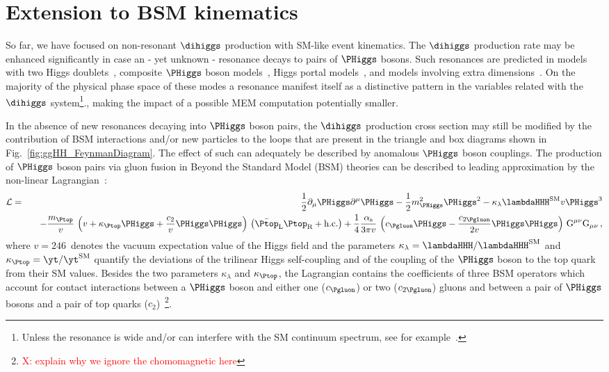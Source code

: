 \newpage
\section{Extension to BSM  kinematics}

So far, we have focused on non-resonant $\dihiggs$ production with SM-like event kinematics. 
The $\dihiggs$ production rate may be enhanced significantly in case an - yet unknown  - resonance decays to pairs of $\PHiggs$ bosons.
Such resonances are predicted in models with two Higgs doublets~\cite{Branco:2011iw}, composite $\PHiggs$ boson models~\cite{Grober:2010yv}, 
Higgs portal models~\cite{Patt:2006fw}, and models involving extra dimensions~\cite{Randall:1999ee}. 
On the majority of the physical phase space of these modes a resonance manifest 
itself as a distinctive pattern in the variables related with the $\dihiggs$ system\footnote{Unless the resonance is wide and/or can interfere with the SM continuum spectrum, see for example~\cite{Dawson:2015haa}.  }., making the impact of a possible MEM computation potentially smaller.

In the absence of new resonances decaying into $\PHiggs$ boson pairs,
the $\dihiggs$ production cross section may still be modified by the contribution of BSM interactions and/or new particles to the loops 
that are present in the triangle and box diagrams shown in Fig.~\ref{fig:ggHH_FeynmanDiagram}. 
The effect of such  can adequately be described by anomalous $\PHiggs$ boson couplings. 
The production of $\PHiggs$ boson pairs via gluon fusion in Beyond the Standard Model (BSM) theories can be described to leading approximation by the non-linear  Lagrangian~\cite{Buchmuller:1985jz}:
\begin{eqnarray}
\mathcal{L} & = & \frac{1}{2} \partial_{\mu}\PHiggs\partial^{\mu}\PHiggs - \frac{1}{2} m_{\PHiggs}^{2} \PHiggs^{2} - \kappa_{\lambda} \lambdaHHH^{\textrm{SM}} v \PHiggs^{3} \nonumber \\
 & & \quad -\frac{m_{\Ptop}}{v} \, \left( v + \kappa_{\Ptop} \PHiggs + \frac{c_{2}}{v} \PHiggs\PHiggs \right) \, \left( \bar{\Ptop}_{\textrm{L}} \Ptop_{\textrm{R}} + \textrm{h.c.} \right) 
+ \frac{1}{4} \frac{\alpha_{\textrm{s}}}{3 \pi v} \, \left( c_{\Pgluon} \PHiggs - \frac{c_{2\Pgluon}}{2 v} \PHiggs\PHiggs \right) \, \textrm{G}^{\mu\nu}\textrm{G}_{\mu\nu} \, ,
\end{eqnarray}
where $v = 246$~\GeV denotes the vacuum expectation value of the Higgs field
and the parameters $\kappa_{\lambda} = \lambdaHHH/\lambdaHHH^{\textrm{SM}}$ and $\kappa_{\Ptop} = \yt/\yt^{\textrm{SM}}$ 
quantify the deviations of the trilinear Higgs self-coupling and of the coupling of the $\PHiggs$ boson to the top quark from their SM values.
Besides the two parameters $\kappa_{\lambda}$ and $\kappa_{\Ptop}$,
the Lagrangian contains the coefficients of three BSM operators which account for contact interactions 
between a $\PHiggs$ boson and either one ($c_{\Pgluon}$) or two ($c_{2\Pgluon}$) gluons
and between a pair of $\PHiggs$ bosons and a pair of top quarks ($c_{2}$)~\footnote{ \textcolor{red}{X: explain why we ignore the chomomagnetic here}}.

